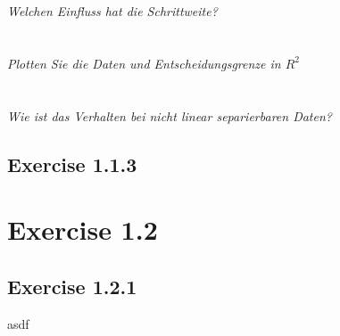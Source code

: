 \documentclass[10pt, journal,compsoc]{article}
\begin{document}
\\
\\

\textit{Welchen Einfluss hat die Schrittweite?}
\\

\\
\\

\textit{Plotten Sie die Daten und Entscheidungsgrenze in $R^2$}
\\
\\
\\

\textit{Wie ist das Verhalten bei nicht linear separierbaren Daten?}

\subsection{Exercise 1.1.3}

\section{Exercise 1.2}
\subsection{Exercise 1.2.1}
asdf
\end{document}
